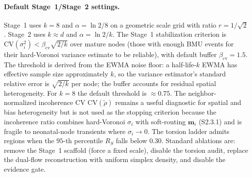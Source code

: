 \documentclass[11pt]{article}
\begin{document}
\paragraph{Default Stage~1/Stage~2 settings.}
Stage~1 uses $k=8$ and $\alpha=\ln 2/8$ on a geometric scale grid with ratio $r=1/\sqrt{2}$. Stage~2 uses $k\approx d$ and $\alpha=\ln 2/k$. The Stage~1 stabilization criterion is $\mathrm{CV}(\sigma_i^2)<\beta_{\mathrm{cv}}\sqrt{2/k}$ over mature nodes (those with enough BMU events for their hard-Voronoi variance estimate to be reliable), with default buffer $\beta_{\mathrm{cv}}=1.5$. The threshold is derived from the EWMA noise floor: a half-life-$k$ EWMA has effective sample size approximately $k$, so the variance estimator's standard relative error is $\sqrt{2/k}$ per node; the buffer accounts for residual spatial heterogeneity. For $k=8$ the default threshold is $\approx0.75$. The neighbor-normalized incoherence CV $\mathrm{CV}(\widetilde\rho)$ remains a useful diagnostic for spatial and bias heterogeneity but is not used as the stopping criterion because the incoherence ratio combines hard-Voronoi $\sigma_i$ with soft-routing $\mathbf m_i$ (S2.3.1) and is fragile to neonatal-node transients where $\sigma_i\to0$. The torsion ladder admits regions when the $95$-th percentile $R_S$ falls below $0.30$. Standard ablations are: remove the Stage~1 scaffold (force a fixed scale), disable the torsion audit, replace the dual-flow reconstruction with uniform simplex density, and disable the evidence gate.
\end{document}
